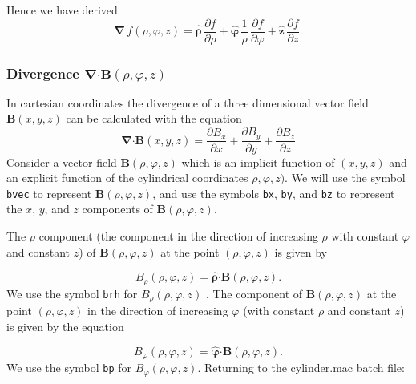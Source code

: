 \documentclass[12pt]{article}
\begin{document}
Hence we have derived
\begin{equation}
\boldsymbol{\nabla} \, f(\rho,\varphi,z) = 
  \boldsymbol{\hat{\rho}}\, \frac{\partial f}{\partial \rho} +
   \boldsymbol{\hat{\varphi}} \, \frac{1}{\rho} \, \frac{\partial f}{\partial \varphi} +
   \mathbf{\hat{z}}\, \frac{\partial f}{\partial z}.
\end{equation}


\subsubsection{Divergence \quad $\boldsymbol{\nabla} \boldsymbol{\cdot} \mathbf{B}(\rho,\varphi,z)$  }
In cartesian coordinates the divergence of a three dimensional vector field 
  $\mathbf{B}(x,y,z)$ can be calculated with the equation
\begin{equation}
\boldsymbol{\nabla} \boldsymbol{\cdot} \mathbf{B}(x,y,z) = \frac{\partial B_{x}}{\partial x} +
                        \frac{\partial B_{y}}{\partial y} +
						\frac{\partial B_{z}}{\partial z}
\end{equation}  
Consider a vector field $\mathbf{B}(\rho,\varphi,z)$ which is an
  implicit function of $(x,y,z)$ and an explicit function of the 
  cylindrical coordinates $\rho,\varphi,z)$.
We will use the symbol \verb|bvec| to represent $\mathbf{B}(\rho,\varphi,z)$, and use the
  symbols \verb|bx|, \verb|by|, and \verb|bz| to represent the $x$, $y$, and $z$ components of
  $\mathbf{B}(\rho,\varphi,z)$.

\smallskip
The $\rho$ component (the component in the direction of increasing $\rho$ with 
  constant $\varphi$ and constant $z$)
 of $\mathbf{B}(\rho,\varphi,z)$ at the point $(\rho,\varphi,z)$ is given by
  
\begin{equation}
 B_{\rho}(\rho,\varphi,z) = \boldsymbol{\hat{\rho}} \boldsymbol{\cdot} \mathbf{B}(\rho,\varphi,z).
\end{equation} 
We use the symbol \verb|brh| for $B_{\rho}(\rho,\varphi,z)$ .
The component of $\mathbf{B}(\rho,\varphi,z)$ at the point $(\rho,\varphi,z)$ in the
  direction of increasing $\varphi$ (with constant $\rho$ and constant $z$) is given by the equation
  
\begin{equation}
B_{\varphi}(\rho,\varphi,z) = \boldsymbol{\hat{\varphi}} \boldsymbol{\cdot} \mathbf{B}(\rho,\varphi,z).
\end{equation}
We use the symbol \verb|bp| for $B_{\varphi}(\rho,\varphi,z)$.    
Returning to the cylinder.mac batch file:  
\end{document}
